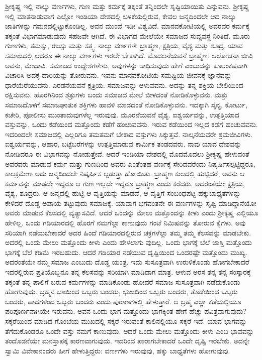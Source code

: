 ಶ್ರೀಕೃಷ್ಣ ಇಲ್ಲಿ ನಾಲ್ಕು ವರ್ಣಗಳು, ಗುಣ ಮತ್ತು ಕರ್ಮಕ್ಕೆ ತಕ್ಕಂತೆ ತನ್ನಿಂದಲೇ ಸೃಷ್ಟಿಯಾಯಿತು ಎನ್ನುವನು. ಶ್ರೀಕೃಷ್ಣ ಇಲ್ಲಿ ಮಾತನಾಡುವಾಗ ಎಲ್ಲೋ ಇಂಡಿಯಾ ದೇಶದಲ್ಲಿ ಬಳಕೆಯಲ್ಲಿರುವ, ಕೇವಲ ಜನ್ಮದಿಂದಲೇ ಆದ ನಾಲ್ಕು ಜಾತಿಗಳನ್ನು ಗಮನದಲ್ಲಿಟ್ಟುಕೊಂಡಿಲ್ಲ. ಅವನ ಮುಂದೆ ಇಡೀ ವಿಶ್ವವಿದೆ. ಮಾನವಕೋಟಿಯಲ್ಲಿ ಅವರವರ ಕರ್ಮಕ್ಕೆ ತಕ್ಕಂತೆ ವಿಭಾಗಮಾಡುವುದು ಸಹಜವೇ ಆಗಿದೆ. ಈ ವಿಭಾಗದ ಮೇಲೆಯೇ ಸಮಾಜದ ಸುವ್ಯವಸ್ಥೆ ನಿಂತಿದೆ. ಮೂರು ಗುಣಗಳು, ತಮಸ್ಸು, ರಜಸ್ಸು ಮತ್ತು ಸತ್ತ್ವ. ನಾಲ್ಕು ವರ್ಣಗಳೇ ಬ್ರಾಹ್ಮಣ, ಕ್ಷತ್ರಿಯ, ವೈಶ್ಯ ಮತ್ತು ಶೂದ್ರ. ಯಾವ ಸಮಾಜದಲ್ಲಿ ಆದರೂ ಈ ನಾಲ್ಕು ವರ್ಣಗಳು ಇರಲೇ ಬೇಕಾಗಿದೆ. ಮೊದಲನೆಯವನೆ ಬ್ರಾಹ್ಮಣ. ಆಲೋಚನಾ ಜೀವಿ ಅವನು, ಮೇಧಾವಿ. ಸಮಾಜದ ಉದ್ದೇಶಗಳೇನು, ಅವುಗಳನ್ನು ಸಾಧಿಸುವುದು ಹೇಗೆ ಎಂಬುದನ್ನು ಕೂಲಂಕಷವಾಗಿ ವಿಚಾರಿಸಿ ಅದಕ್ಕೆ ದಾರಿಯನ್ನು ತೋರುವನು. ಇವನು ಮಾನವಕೋಟಿಯ ಸಮಷ್ಟಿಯ ಜೀವನಕ್ಕೆ ಜ್ಞಾನವನ್ನು ಧಾರೆಯೆರೆಯುವನು. ಎರಡನೆಯವನೆ ಕ್ಷತ್ರಿಯ. ಸಮಾಜವನ್ನು ಆಳುವವನು. ಅದನ್ನು ತನ್ನ ಶಕ್ತಿಯ ಬೇಲಿಯಿಂದ ರಕ್ಷಿಸುವನು. ಹೊರಗಿನಿಂದ ಶತ್ರುಗಳು ಬಂದು ಸಮಾಜದ ಮೇಲೆ ಬೀಳದಂತೆ ನೋಡಿಕೊಳ್ಳುವನು. ಮತ್ತು ಸಮಾಜದೊಳಗೆ ಸಮಾಜಘಾತುಕ ಶಕ್ತಿಗಳು ಹಾವಳಿ ಮಾಡದಂತೆ ನೋಡಿಕೊಳ್ಳುವನು. ಇದಕ್ಕಾಗಿ ಸೈನ್ಯ, ಕೋರ್ಟು, ಕಚೇರಿ, ಪೋಲೀಸು ಮುಂತಾದುವುಗಳೆಲ್ಲ ಇರುವುವು. ಮೂರನೆಯವನೆ ವೈಶ್ಯ. ಐಶ್ವರ್ಯವನ್ನು, ಉತ್ಪತ್ತಿಯಾದ ವಸ್ತುವನ್ನು, ಒಂದು ಕಡೆಯಿಂದ ಮತ್ತೊಂದು ಕಡೆಗೆ ಹಂಚುವವನು. ಇರುವ ಕಡೆಯಿಂದ ಇಲ್ಲದ ಕಡೆಗೆ ಹಂಚುವವನು. ಇದರಿಂದಲೇ ಸಮಾಜದಲ್ಲಿ ಎಲ್ಲರಿಗೂ ತಮತಮಗೆ ಬೇಕಾದ ವಸ್ತುಗಳು ಸಿಕ್ಕುತ್ತವೆ. ನಾಲ್ಕನೆಯವರೇ ಶ್ರಮಜೀವಿಗಳು. ಐಶ್ವರ್ಯವನ್ನು, ಆಹಾರ, ಬಟ್ಟೆಬರೆಗಳನ್ನು ಉತ್ಪತ್ತಿಮಾಡುವ ಕಾರ್ಮಿಕ ತಂಡದವರು. ನಾವು ಯಾವ ದೇಶವನ್ನು ನೋಡಿದರೂ ಈ ವಿಭಾಗವನ್ನು ನೋಡುತ್ತೇವೆ. ಆದರೆ ಇಂಡಿಯಾ ದೇಶದಲ್ಲಿ ಮೊದಮೊದಲು ಶ್ರೀಕೃಷ್ಣ ಹೇಳುವಂತೆ ಅವರವರು ಮಾಡುವ ಕರ್ಮ ಮತ್ತು ಗುಣದಿಂದ ಅವರು ಎಂತೆಂತಹ ವರ್ಣಕ್ಕೆ ಸೇರಿದವರೆಂದು ನಿಷ್ಕರ್ಷಿಸಲ್ಪಟ್ಟಿದ್ದರೂ, ಕಾಲಕ್ರಮೇಣ ಅದು ಜನ್ಮದಿಂದಲೇ ನಿಷ್ಕರ್ಷಿಸ ಲ್ಪಡುತ್ತಾ ಹೋಯಿತು. ಬ್ರಾಹ್ಮಣ ಕುಲದಲ್ಲಿ ಹುಟ್ಟಿದರೆ, ಅವನು ಆ ಕರ್ಮವನ್ನು ಮಾಡದೇ ಇದ್ದರೂ ಆ ಗುಣ ಇಲ್ಲದೇ ಇದ್ದರೂ ಬ್ರಾಹ್ಮಣ ಎಂದು ಕರೆದರು. ಅದರಂತೆಯೇ ಕ್ಷತ್ರಿಯ, ವೈಶ್ಯ, ಶೂದ್ರರು. ಆ ಜನ್ಮದಲ್ಲಿ ಹುಟ್ಟಿ ಆ ವೃತ್ತಿಯನ್ನು ಮಾಡದೆ, ಆ ವೃತ್ತಿಗೆ ಸಂಬಂಧಪಟ್ಟ ಹಕ್ಕುಬಾಧ್ಯತೆಗಳನ್ನು ಕೇಳಿದರೆ ದೊಡ್ಡ ಅಪಾಯ ತಟ್ಟುವುದು ಸಮಾಜಕ್ಕೆ. ಯಾವಾಗ ಭಗವಂತನೇ ಈ ವರ್ಣಗಳನ್ನು ಸೃಷ್ಟಿ ಮಾಡಿದ್ದಾನೆಯೋ ಅವರು ಮಾಡುವ ಕೆಲಸದಲ್ಲಿ ವ್ಯತ್ಯಾಸವಿದೆ. ಆದರೆ ಒಂದನ್ನು ಮೇಲು ಮತ್ತೊಂದನ್ನು ಕೀಳು ಎಂದು ಶ್ರೀಕೃಷ್ಣ ಎಲ್ಲಿಯೂ ಹೇಳಿಲ್ಲ. ಒಂದು ಗಡಿಯಾರದಲ್ಲಿ ಹೊರಗೆ ನಮಗೆಲ್ಲಾ ಕಾಣುವುದು ಗಂಟೆ ನಿಮಿಷವನ್ನು ತೋರುವ ಕೈಗಳು. ಅವು ಸರಿಯಾಗಿ ನಡೆಯಬೇಕಾದರೆ ಅದರ ಹಿಂದೆ ಗಡಿಯಾರದಲ್ಲಿರುವ ಚಕ್ರಗಳೆಲ್ಲಾ ತಮ್ಮ ತಮ್ಮ ಕೆಲಸವನ್ನು ಮಾಡಬೇಕು. ಅದರಲ್ಲಿ ಒಂದು ಮೇಲು ಮತ್ತೊಂದು ಕೀಳು ಎಂದು ಹೇಳಲಾಗು ವುದಿಲ್ಲ. ಒಂದು ಭಾಗಕ್ಕೆ ಬೆಲೆ ಜಾಸ್ತಿ ಮತ್ತೊಂದು ಭಾಗಕ್ಕೆ ಬೆಲೆ ಕಡಿಮೆ ಇರಬಹುದು. ಆದರೆ ಗಡಿಯಾರ ನಡೆಯುವ ದೃಷ್ಟಿಯಿಂದ ಒಂದರಷ್ಟೇ ಮತ್ತೊಂದು ಮುಖ್ಯ. ಅದರಂತೆಯೇ ನಮ್ಮ ಸಮಾಜ ಎಂಬುದು ದೊಡ್ಡ ಯಂತ್ರ. ಇದು ಸುಸೂತ್ರವಾಗಿ ಉರುಳಿಕೊಂಡು ಹೋಗಬೇಕಾದರೆ ಇದರಲ್ಲಿರುವ ಪ್ರತಿಯೊಬ್ಬನೂ ತನ್ನ ಕೆಲಸವನ್ನು ಸರಿಯಾಗಿ ಮಾಡಿದಾಗ ಮಾತ್ರ. ಆಳುವ ಅರಸ ತನ್ನ ತನ್ನ ಸಂಸ್ಕಾರಕ್ಕೆ ತಕ್ಕಂತೆ ತನ್ನ ಪಾಲಿಗೆ ಬರುವ ಕರ್ಮಗಳನ್ನು ಮಾಡಿಕೊಂಡು ಹೋದರೆ ಸಮಾಜ ಸುಸೂತ್ರವಾಗಿ ನಡೆದುಕೊಂಡು ಹೋಗುವುದು. ಬ್ರಹ್ಮನ ಬಾಯಿಂದ ಒಬ್ಬರು ಬಂದರು, ಭುಜದಿಂದ ಒಬ್ಬರು ಬಂದರು, ತೊಡೆಯಿಂದ ಒಬ್ಬರು ಬಂದರು, ಪಾದಗಳಿಂದ ಒಬ್ಬರು ಬಂದರು ಎಂದು ಪುರಾಣಗಳಲ್ಲಿ ಹೇಳುತ್ತಾರೆ. ಆ ಬ್ರಹ್ಮ ಎಲ್ಲಾ ಕಡೆಯಲ್ಲಿಯೂ ಪರಿಪೂರ್ಣನಾಗಿಯೇ ಇರುವನು. ಅವನ ಒಂದು ಭಾಗ ಮತ್ತೊಂದು ಭಾಗಕ್ಕಿಂತ ಹೇಗೆ ಹೆಚ್ಚು ಪವಿತ್ರವಾಗುವುದು? ಸಕ್ಕರೆಯಿಂದ ಮಾಡಿದ ಗೊಂಬೆಯ ಮುಖದಲ್ಲಿ ಸಕ್ಕರೆ ಇರುವಂತೆ ಕಾಲಿನಲ್ಲಿಯೂ ಸಕ್ಕರೆ ಇದೆ. ಯಾವ ಭಾಗವನ್ನು ತೆಗೆದುಕೊಂಡರೂ ಒಂದೇ ವಸ್ತು ನಮಗೆ ಕಾಣುವುದು. ಆದರೆ ಒಂದು ಮೇಲು ಮತ್ತೊಂದು ಕೀಳು ಎಂಬ ಭಾವವನ್ನು ತಂದೊಡನೆಯೇ ಮನಸ್ತಾಪಕ್ಕೆ ಕಾರಣವಾಗುವುದು. ಇದರಿಂದ ಪಾರಾಗಬೇಕಾದರೆ ಒಂದೇ ದೃಷ್ಟಿ ಇರಬೇಕು. ಅದನ್ನೇ ಸ್ವಾಮಿ ವಿವೇಕಾನಂದರು ಹೀಗೆ ಹೇಳುತ್ತಿದ್ದರು: ವರ್ಣಗಳು ಇರುವುವು, ಹಕ್ಕು ಬಾಧ್ಯತೆಗಳು ಹೋಗುವುವು.

